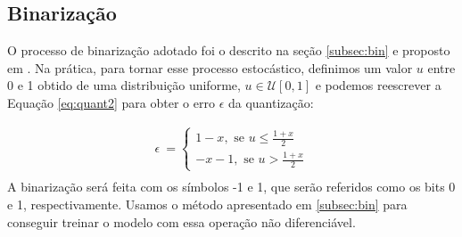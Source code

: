 \subsection{Binarização}

O processo de binarização adotado foi o descrito na seção \ref{subsec:bin} e proposto em \cite{Variable2016Toderici}.
Na prática, para tornar esse processo estocástico,  definimos um valor $u$ entre 0 e 1 obtido de uma distribuição uniforme,  $u \in \mathcal{U}[0,1]$ e podemos reescrever a Equação \ref{eq:quant2}  para obter o erro $\epsilon$ da quantização:

\begin{equation}
\label{eq:quant}
\begin{aligned}
\epsilon \ = \left\{
\begin{array}{ll}
1 - x, \text{ se $u$}  \leq \frac{1 + x}{2} \\
-x - 1, \text{ se $u$} > \frac{1 + x}{2}
\end{array}
\right. \\
\end{aligned}
\end{equation}
A binarização será feita com os símbolos -1 e 1, que serão referidos como os bits 0 e 1, respectivamente. Usamos o método apresentado em \ref{subsec:bin} para conseguir treinar o modelo com essa operação não diferenciável. 









